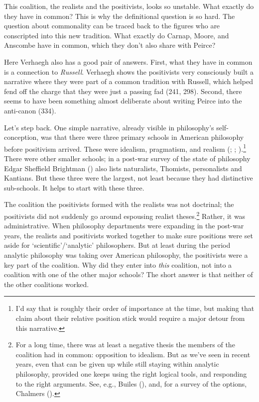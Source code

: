 \documentclass[
  11pt,
  letterpaper,
  DIV=11,
  numbers=noendperiod,
  twoside]{scrartcl}
\begin{document}
This coalition, the realists and the positivists, looks so unstable.
What exactly do they have in common? This is why the definitional
question is so hard. The question about commonality can be traced back
to the figures who are conscripted into this new tradition. What exactly
do Carnap, Moore, and Anscombe have in common, which they don't also
share with Peirce?

Here Verhaegh also has a good pair of answers. First, what they have in
common is a connection to \emph{Russell}. Verhaegh shows the positivists
very consciously built a narrative where they were part of a common
tradition with Russell, which helped fend off the charge that they were
just a passing fad (241, 298). Second, there seems to have been
something almost deliberate about writing Peirce into the anti-canon
(334).

Let's step back. One simple narrative, already visible in philosophy's
self-conception, was that there were three primary schools in American
philosophy before positivism arrived. These were idealism, pragmatism,
and realism (;
;
).\footnote{I'd say that
  is roughly their order of importance at the time, but making that
  claim about their relative position stick would require a major detour
  from this narrative.} There were other smaller schools; in a post-war
survey of the state of philosophy Edgar Sheffield Brightman
() also lists naturalists, Thomists,
personalists and Kantians. But these three were the largest, not least
because they had distinctive sub-schools. It helps to start with these
three.

The coalition the positivists formed with the realists was not
doctrinal; the positivists did not suddenly go around espousing realist
theses.\footnote{For a long time, there was at least a negative thesis
  the members of the coalition had in common: opposition to idealism.
  But as we've seen in recent years, even that can be given up while
  still staying within analytic philosophy, provided one keeps using the
  right logical tools, and responding to the right arguments. See, e.g.,
  Builes (), and, for a survey of the
  options, Chalmers ().} Rather, it was
administrative. When philosophy departments were expanding in the
post-war years, the realists and positivists worked together to make
sure positions were set aside for `scientific'/`analytic' philosophers.
But at least during the period analytic philosophy was taking over
American philosophy, the positivists were a key part of the coalition.
Why did they enter into \emph{this} coalition, not into a coalition with
one of the other major schools? The short answer is that neither of the
other coalitions worked.
\end{document}
